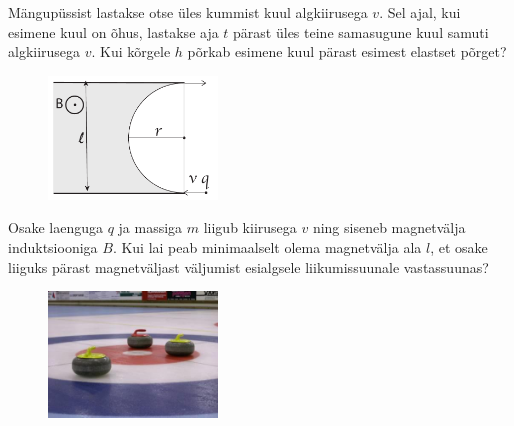 \documentclass[10pt]{article}
\begin{document}

Mängupüssist lastakse otse üles kummist kuul algkiirusega $v$. Sel ajal, kui esimene kuul on õhus, lastakse aja $t$ pärast üles teine samasugune kuul samuti algkiirusega $v$. Kui kõrgele $h$ põrkab esimene kuul pärast esimest elastset põrget?
\probend
\bigskip

\setAuthor{}

\begin{figure}
	\vspace{-15pt}
	\begin{center}
		\includegraphics[width = 0.4\textwidth]{2019-v2g-05-yl.pdf}
	\end{center}
\end{figure}


Osake laenguga $q$ ja massiga $m$ liigub kiirusega $v$ ning siseneb  magnetvälja induktsiooniga $B$. Kui lai peab minimaalselt olema magnetvälja ala $l$, et osake liiguks pärast magnetväljast väljumist esialgsele liikumissuunale vastassuunas?
\probend
\bigskip

\setAuthor{}

\begin{figure}
  \vspace{-25pt}
  \begin{center}
    \includegraphics[width=0.4\textwidth]{2019-v3g-05-yl.jpg}
  \end{center}
  \vspace{-20pt}
\end{figure}
\end{document}
